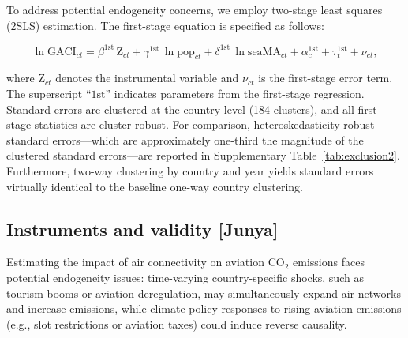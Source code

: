 \documentclass[12pt]{extarticle}
\begin{document}
To address potential endogeneity concerns, we employ two-stage least squares (2SLS) estimation. The first-stage equation is specified as follows:

\begin{equation}
\ln \mathrm{GACI}_{ct} = \beta^{\mathrm{1st}} \,\mathrm{Z}_{ct}
 + \gamma^{\mathrm{1st}} \,\ln \mathrm{pop}_{ct} + \delta^{\mathrm{1st}} \,\ln \mathrm{seaMA}_{ct}
 + \alpha_c^{\mathrm{1st}} + \tau_t^{\mathrm{1st}} + \nu_{ct},
\label{eq:firststage}
\end{equation}

where $\mathrm{Z}_{ct}$ denotes the instrumental variable and $\nu_{ct}$ is the first-stage error term. The superscript ``$\mathrm{1st}$'' indicates parameters from the first-stage regression. Standard errors are clustered at the country level (184 clusters), and all first-stage statistics are cluster-robust. For comparison, heteroskedasticity-robust standard errors---which are approximately one-third the magnitude of the clustered standard errors---are reported in Supplementary Table~\ref{tab:exclusion2}. Furthermore, two-way clustering by country and year yields standard errors virtually identical to the baseline one-way country clustering.


\subsection*{Instruments and validity [Junya]}

Estimating the impact of air connectivity on aviation CO$_2$ emissions faces potential endogeneity issues: time-varying country-specific shocks, such as tourism booms or aviation deregulation, may simultaneously expand air networks and increase emissions, while climate policy responses to rising aviation emissions (e.g., slot restrictions or aviation taxes) could induce reverse causality.
\end{document}
